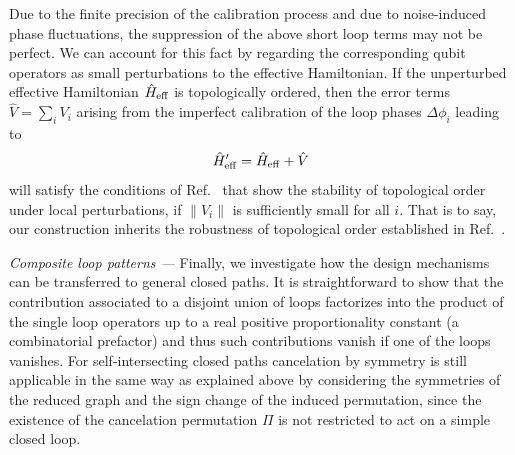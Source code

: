 \documentclass[twocolumn,floats,prx,showpacs]{revtex4-1}
\begin{document}
Due to the finite precision of the calibration process and due to noise-induced phase fluctuations, the suppression of the above short loop terms may not be perfect. We can account for this fact by regarding the corresponding qubit operators as small perturbations to the effective Hamiltonian. If the unperturbed effective Hamiltonian 
$\hat H_{\rm eff}$ is topologically ordered, 
then the error terms $\hat V= \sum_{i} V_{i} $ arising from the imperfect calibration of the loop phases $\Delta \phi_i$ leading to
\begin{equation}
\hat H_{\rm eff}'= \hat H_{\rm eff} + \hat V 
\end{equation}
will satisfy the conditions of 
Ref.~\cite{1001.0344} that show the stability of topological order under local
perturbations, if $\|V_{i}\|$ is sufficiently small for all $i$. That is to say, our construction inherits the robustness of topological order established in Ref.~\cite{1001.0344}.

\emph{Composite loop patterns ---}
Finally, we investigate how the design mechanisms can be transferred to general closed paths. It is straightforward to show that the contribution associated to a disjoint union of loops factorizes into the product of the single loop operators up to a real positive proportionality constant (a combinatorial prefactor) and thus such contributions vanish if one of the loops vanishes. 
For self-intersecting closed paths cancelation by symmetry is still applicable in the same way as explained above by considering the symmetries of the reduced graph and the sign change of the induced permutation, since the existence of the cancelation permutation $\Pi$ is not restricted to act on a simple closed loop. 
\end{document}
